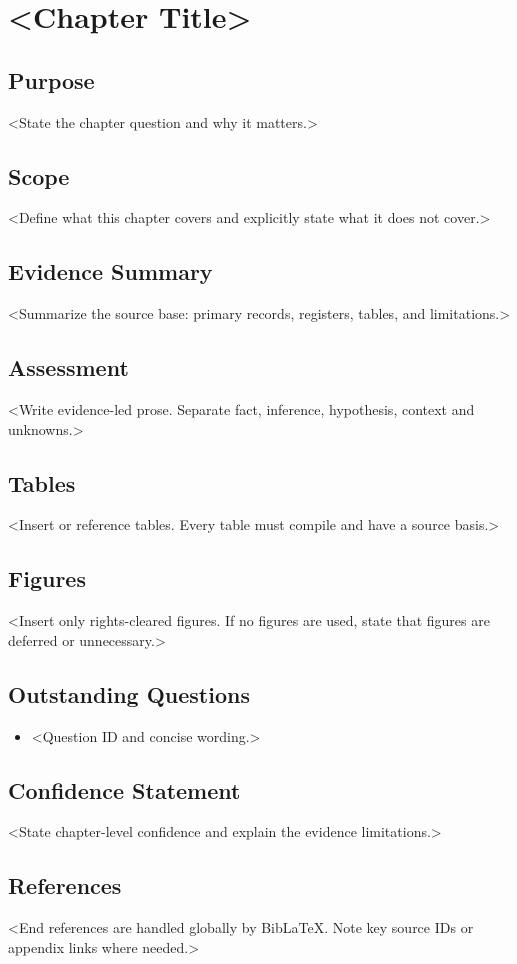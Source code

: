 
\chapter{<Chapter Title>}
\label{chap:<chapter-slug>}


\section{Purpose}
<State the chapter question and why it matters.>

\section{Scope}
<Define what this chapter covers and explicitly state what it does not cover.>

\section{Evidence Summary}
<Summarize the source base: primary records, registers, tables, and limitations.>

\section{Assessment}
<Write evidence-led prose. Separate fact, inference, hypothesis, context and unknowns.>

\section{Tables}
<Insert or reference tables. Every table must compile and have a source basis.>

\section{Figures}
<Insert only rights-cleared figures. If no figures are used, state that figures are deferred or unnecessary.>

\section{Outstanding Questions}
\begin{itemize}
  \item <Question ID and concise wording.>
\end{itemize}

\section{Confidence Statement}
<State chapter-level confidence and explain the evidence limitations.>

\section{References}
<End references are handled globally by BibLaTeX. Note key source IDs or appendix links where needed.>
